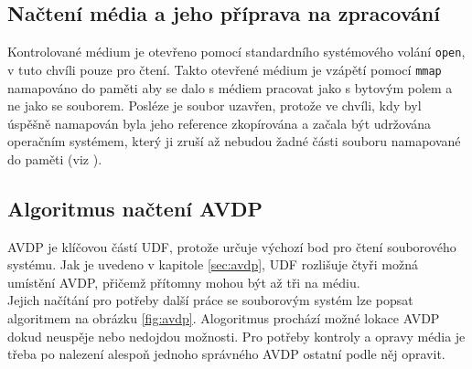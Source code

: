 \subsection{Načtení média a jeho příprava na zpracování}
Kontrolované médium je otevřeno pomocí standardního systémového volání \texttt{open}, v tuto chvíli pouze pro čtení. Takto otevřené médium je vzápětí pomocí \texttt{mmap} namapováno do paměti aby se dalo s médiem pracovat jako s bytovým polem a ne jako se souborem. Posléze je soubor uzavřen, protože ve chvíli, kdy byl úspěšně namapován byla jeho reference zkopírována a začala být udržována operačním systémem, který ji zruší až nebudou žadné části souboru namapované do paměti (viz \cite{posix-mmap}). 

\subsection{Algoritmus načtení AVDP}
AVDP je klíčovou částí UDF, protože určuje výchozí bod pro čtení souborového systému. Jak je uvedeno v kapitole \ref{sec:avdp}, UDF rozlišuje čtyři možná umístění AVDP, přičemž přítomny mohou být až tři na médiu.\\
Jejich načítání pro potřeby další práce se souborovým systém lze popsat algoritmem na obrázku \ref{fig:avdp}. Alogoritmus prochází možné lokace AVDP dokud neuspěje nebo nedojdou možnosti. Pro potřeby kontroly a opravy média je třeba po nalezení alespoň jednoho správného AVDP ostatní podle něj opravit.
